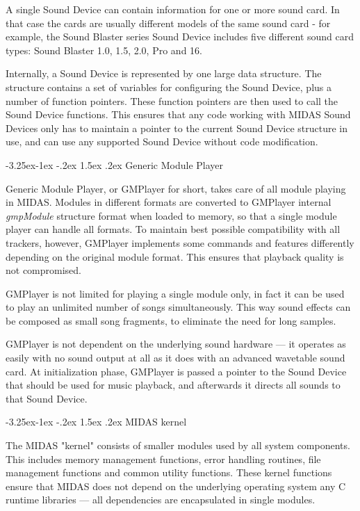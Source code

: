 \documentclass[a4paper,12pt,oneside]{book}
\makeatletter
\renewcommand\subsection{\@startsection{subsection}{2}{-20pt}%
                                     {-3.25ex\@plus -1ex \@minus -.2ex}%
                                     {1.5ex \@plus .2ex}%
                                     {\normalfont\large\bfseries}}
\makeatother
\begin{document}
A single Sound Device can contain information for one or more sound card. In
that case the cards are usually different models of the same sound card - for
example, the Sound Blaster series Sound Device includes five different sound
card types: Sound Blaster 1.0, 1.5, 2.0, Pro and 16.

Internally, a Sound Device is represented by one large data structure. The
structure contains a set of variables for configuring the Sound Device, plus
a number of function pointers. These function pointers are then used to
call the Sound Device functions. This ensures that any code working with
MIDAS Sound Devices only has to maintain a pointer to the current Sound
Device structure in use, and can use any supported Sound Device without code
modification.


\subsection{Generic Module Player}

Generic Module Player, or GMPlayer for short, takes care of all module
playing in MIDAS. Modules in different formats are converted to GMPlayer
internal {\em gmpModule}        %
structure format when loaded to memory,
so that a single module player can handle all formats. To maintain best
possible compatibility with all trackers, however, GMPlayer implements some
commands and features differently depending on the original module format.
This ensures that playback quality is not compromised.

GMPlayer is not limited for playing a single module only, in fact it can be
used to play an unlimited number of songs simultaneously. This way sound
effects can be composed as small song fragments, to eliminate the need for
long samples.

GMPlayer is not dependent on the underlying sound hardware --- it operates as
easily with no sound output at all as it does with an advanced wavetable
sound card. At initialization phase, GMPlayer is passed a pointer to the
Sound Device that should be used for music playback, and afterwards it
directs all sounds to that Sound Device.


\subsection{MIDAS kernel}

The MIDAS "kernel" consists of smaller modules used by all system components.
This includes %
memory management functions, error handling routines, file management
functions and common utility functions. These kernel functions ensure that
MIDAS does not depend on the underlying operating system any C runtime
libraries --- all dependencies are encapsulated in single modules.
\end{document}
